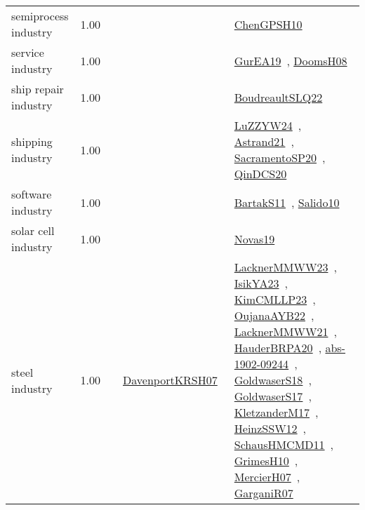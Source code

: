 {\begin{longtable}{p{3cm}r>{\raggedright\arraybackslash}p{6cm}>{\raggedright\arraybackslash}p{6cm}>{\raggedright\arraybackslash}p{8cm}}
\index{semiprocess industry}\index{Industries!semiprocess industry}semiprocess industry &  1.00 &  &  & \href{../works/ChenGPSH10.pdf}{ChenGPSH10}~\cite{ChenGPSH10}\\
\index{service industry}\index{Industries!service industry}service industry &  1.00 &  &  & \href{../works/GurEA19.pdf}{GurEA19}~\cite{GurEA19}, \href{../works/DoomsH08.pdf}{DoomsH08}~\cite{DoomsH08}\\
\index{ship repair industry}\index{Industries!ship repair industry}ship repair industry &  1.00 &  &  & \href{../works/BoudreaultSLQ22.pdf}{BoudreaultSLQ22}~\cite{BoudreaultSLQ22}\\
\index{shipping industry}\index{Industries!shipping industry}shipping industry &  1.00 &  &  & \href{../works/LuZZYW24.pdf}{LuZZYW24}~\cite{LuZZYW24}, \href{../works/Astrand21.pdf}{Astrand21}~\cite{Astrand21}, \href{../works/SacramentoSP20.pdf}{SacramentoSP20}~\cite{SacramentoSP20}, \href{../works/QinDCS20.pdf}{QinDCS20}~\cite{QinDCS20}\\
\index{software industry}\index{Industries!software industry}software industry &  1.00 &  &  & \href{../works/BartakS11.pdf}{BartakS11}~\cite{BartakS11}, \href{../works/Salido10.pdf}{Salido10}~\cite{Salido10}\\
\index{solar cell industry}\index{Industries!solar cell industry}solar cell industry &  1.00 &  &  & \href{../works/Novas19.pdf}{Novas19}~\cite{Novas19}\\
\index{steel industry}\index{Industries!steel industry}steel industry &  1.00 &  & \href{../works/DavenportKRSH07.pdf}{DavenportKRSH07}~\cite{DavenportKRSH07} & \href{../works/LacknerMMWW23.pdf}{LacknerMMWW23}~\cite{LacknerMMWW23}, \href{../works/IsikYA23.pdf}{IsikYA23}~\cite{IsikYA23}, \href{../works/KimCMLLP23.pdf}{KimCMLLP23}~\cite{KimCMLLP23}, \href{../works/OujanaAYB22.pdf}{OujanaAYB22}~\cite{OujanaAYB22}, \href{../works/LacknerMMWW21.pdf}{LacknerMMWW21}~\cite{LacknerMMWW21}, \href{../works/HauderBRPA20.pdf}{HauderBRPA20}~\cite{HauderBRPA20}, \href{../works/abs-1902-09244.pdf}{abs-1902-09244}~\cite{abs-1902-09244}, \href{../works/GoldwaserS18.pdf}{GoldwaserS18}~\cite{GoldwaserS18}, \href{../works/GoldwaserS17.pdf}{GoldwaserS17}~\cite{GoldwaserS17}, \href{../works/KletzanderM17.pdf}{KletzanderM17}~\cite{KletzanderM17}, \href{../works/HeinzSSW12.pdf}{HeinzSSW12}~\cite{HeinzSSW12}, \href{../works/SchausHMCMD11.pdf}{SchausHMCMD11}~\cite{SchausHMCMD11}, \href{../works/GrimesH10.pdf}{GrimesH10}~\cite{GrimesH10}, \href{../works/MercierH07.pdf}{MercierH07}~\cite{MercierH07}, \href{../works/GarganiR07.pdf}{GarganiR07}~\cite{GarganiR07}\\

\end{longtable}}
